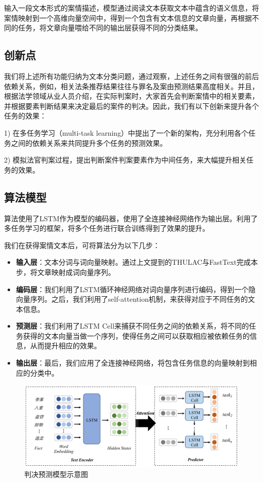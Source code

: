 输入一段文本形式的案情描述，模型通过阅读文本获取文本中蕴含的语义信息，将案情映射到一个高维向量空间中，得到一个包含有文本信息的文章向量，再根据不同的任务，将文章向量喂给不同的输出层获得不同的分类结果。

\subsection{创新点}
我们将上述所有功能归纳为文本分类问题，通过观察，上述任务之间有很强的前后依赖关系，例如，相关法条推荐结果往往与罪名及案由预测结果高度相关。并且，根据法学领域从业人员介绍，在实际判案时，大家首先会判断案情中的相关要素，并根据要素判断结果来决定最后的案件的判决。因此，我们有以下创新来提升各个任务的效果：

1)	在多任务学习（multi-task learning）中提出了一个新的架构，充分利用各个任务之间的依赖关系来共同提升多个任务的预测效果。

2)	模拟法官判案过程，提出判断案件判案要素作为中间任务，来大幅提升相关任务的效果。



\subsection{算法模型}
算法使用了LSTM作为模型的编码器，使用了全连接神经网络作为输出层。利用了多任务学习的框架，将多个任务进行联合训练得到了效果的提升。

我们在获得案情文本后，可将算法分为以下几步：
\begin{itemize}
	\item \textbf{输入层}：文本分词与词向量映射。通过上文提到的THULAC与FastText完成本步，将文章映射成词向量序列。
	\item \textbf{编码层}：我们利用了LSTM循环神经网络对词向量序列进行编码，得到一个隐向量序列。之后，我们利用了self-attention机制，来获得对应于不同任务的文本信息。
	\item \textbf{预测层}：我们利用了LSTM Cell来捕获不同任务之间的依赖关系，将不同的任务获得的文本向量当做一个序列，使得任务之间可以获取相应被依赖任务的信息，从而提升相应的效果。
	\item \textbf{输出层}：最后，我们应用了全连接神经网络，将包含任务信息的向量映射到相应的分类中。
\end{itemize}

\begin{figure}[ht]
    \centering
    \includegraphics[width=\linewidth]{figures/model1}
    \caption{判决预测模型示意图}
    \label{fig:model1}
\end{figure}


